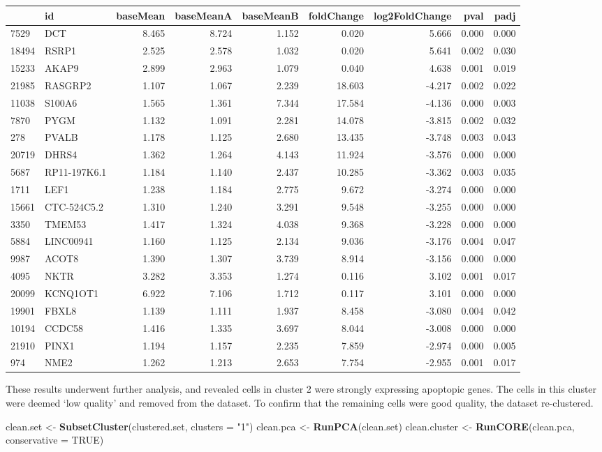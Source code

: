 \documentclass[]{article}
\newenvironment{Shaded}{\begin{snugshade}}{\end{snugshade}}
\newcommand{\DataTypeTok}[1]{\textcolor[rgb]{0.13,0.29,0.53}{#1}}
\newcommand{\KeywordTok}[1]{\textcolor[rgb]{0.13,0.29,0.53}{\textbf{#1}}}
\newcommand{\NormalTok}[1]{#1}
\newcommand{\OtherTok}[1]{\textcolor[rgb]{0.56,0.35,0.01}{#1}}
\newcommand{\StringTok}[1]{\textcolor[rgb]{0.31,0.60,0.02}{#1}}
\begin{document}
\begin{longtable}[]{@{}llrrrrrrr@{}}
\toprule
& id & baseMean & baseMeanA & baseMeanB & foldChange & log2FoldChange &
pval & padj\tabularnewline
\midrule
\endhead
7529 & DCT & 8.465 & 8.724 & 1.152 & 0.020 & 5.666 & 0.000 &
0.000\tabularnewline
18494 & RSRP1 & 2.525 & 2.578 & 1.032 & 0.020 & 5.641 & 0.002 &
0.030\tabularnewline
15233 & AKAP9 & 2.899 & 2.963 & 1.079 & 0.040 & 4.638 & 0.001 &
0.019\tabularnewline
21985 & RASGRP2 & 1.107 & 1.067 & 2.239 & 18.603 & -4.217 & 0.002 &
0.022\tabularnewline
11038 & S100A6 & 1.565 & 1.361 & 7.344 & 17.584 & -4.136 & 0.000 &
0.003\tabularnewline
7870 & PYGM & 1.132 & 1.091 & 2.281 & 14.078 & -3.815 & 0.002 &
0.032\tabularnewline
278 & PVALB & 1.178 & 1.125 & 2.680 & 13.435 & -3.748 & 0.003 &
0.043\tabularnewline
20719 & DHRS4 & 1.362 & 1.264 & 4.143 & 11.924 & -3.576 & 0.000 &
0.000\tabularnewline
5687 & RP11-197K6.1 & 1.184 & 1.140 & 2.437 & 10.285 & -3.362 & 0.003 &
0.035\tabularnewline
1711 & LEF1 & 1.238 & 1.184 & 2.775 & 9.672 & -3.274 & 0.000 &
0.000\tabularnewline
15661 & CTC-524C5.2 & 1.310 & 1.240 & 3.291 & 9.548 & -3.255 & 0.000 &
0.000\tabularnewline
3350 & TMEM53 & 1.417 & 1.324 & 4.038 & 9.368 & -3.228 & 0.000 &
0.000\tabularnewline
5884 & LINC00941 & 1.160 & 1.125 & 2.134 & 9.036 & -3.176 & 0.004 &
0.047\tabularnewline
9987 & ACOT8 & 1.390 & 1.307 & 3.739 & 8.914 & -3.156 & 0.000 &
0.000\tabularnewline
4095 & NKTR & 3.282 & 3.353 & 1.274 & 0.116 & 3.102 & 0.001 &
0.017\tabularnewline
20099 & KCNQ1OT1 & 6.922 & 7.106 & 1.712 & 0.117 & 3.101 & 0.000 &
0.000\tabularnewline
19901 & FBXL8 & 1.139 & 1.111 & 1.937 & 8.458 & -3.080 & 0.004 &
0.042\tabularnewline
10194 & CCDC58 & 1.416 & 1.335 & 3.697 & 8.044 & -3.008 & 0.000 &
0.000\tabularnewline
21910 & PINX1 & 1.194 & 1.157 & 2.235 & 7.859 & -2.974 & 0.000 &
0.005\tabularnewline
974 & NME2 & 1.262 & 1.213 & 2.653 & 7.754 & -2.955 & 0.001 &
0.017\tabularnewline
\bottomrule
\end{longtable}

These results underwent further analysis, and revealed cells in cluster
2 were strongly expressing apoptopic genes. The cells in this cluster
were deemed `low quality' and removed from the dataset. To confirm that
the remaining cells were good quality, the dataset re-clustered.

\begin{Shaded}
\begin{Highlighting}[]
\NormalTok{clean.set <-}\StringTok{ }\KeywordTok{SubsetCluster}\NormalTok{(clustered.set, }\DataTypeTok{clusters =} \StringTok{"1"}\NormalTok{)}
\NormalTok{clean.pca <-}\StringTok{ }\KeywordTok{RunPCA}\NormalTok{(clean.set)}
\NormalTok{clean.cluster <-}\StringTok{ }\KeywordTok{RunCORE}\NormalTok{(clean.pca, }\DataTypeTok{conservative =} \OtherTok{TRUE}\NormalTok{)}
\end{Highlighting}
\end{Shaded}
\end{document}
